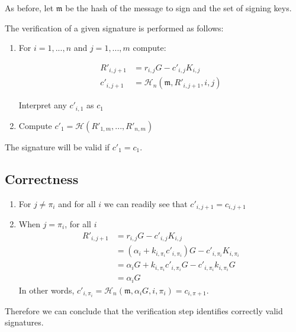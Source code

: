 As before, let \(\mathfrak{m}\) be the hash of the message to sign and the set of signing keys.

The verification of a given signature is performed as follows:

\begin{enumerate}
	
	\item For \(i = 1, ..., n \) and \(j = 1, ..., m \) compute:
	

	\begin{align*}
	   R'_{i, j+1} &= r_{i, j} G - c'_{i, j} K_{i, j} \\
	   c'_{i, j+1} &= \mathcal{H}_n (\mathfrak{m}, R'_{i, j+1}, i, j) 
	\end{align*}
	
	Interpret any \(c'_{i, 1}\) as \(c_1\)
	
	\item Compute \(c'_1 = \mathcal{H}(R'_{1, m}, ..., R'_{n, m}) \)	
	
\end{enumerate}

The signature will be valid if \(c'_1 = c_1\).




\subsection*{Correctness}


\begin{enumerate}
	\item For \(j \ne \pi_i\) and for all \(i\) we can readily see that \(c'_{i, j+1} = c_{i, j+1}\)
	
	\item When \(j = \pi_i\), for all \(i \)
	\begin{align*}
	R'_{i, j+1} &= r_{i, j} G - c'_{i, j} K_{i, j} \\
	            &= (\alpha_i + k_{i, \pi_i} c'_{i, \pi_{i}}) G - c'_{i, \pi_i} K_{i, \pi_i} \\
	            &= \alpha_i G + k_{i, \pi_i} c'_{i, \pi_{i}} G - c'_{i, \pi_i} k_{i, \pi_i} G \\
	            &= \alpha_i G 
	\end{align*}
	In other words, \(c'_{i, \pi_i} = \mathcal{H}_n(\mathfrak{m}, \alpha_i G, i, \pi_i) = c_{i, \pi+1}\).
	
\end{enumerate}

Therefore we can conclude that the verification step identifies correctly valid signatures.














 



